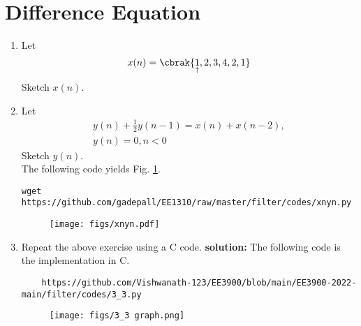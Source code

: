 \documentclass[journal,12pt,twocolumn]{IEEEtran}
\renewcommand\thesection{\arabic{section}}
\begin{document}
\section{Difference Equation}
\begin{enumerate}[label=\thesection.\arabic*,ref=\thesection.\theenumi]
\item Let
\label{def:xn}
\begin{equation}
x(n) = \cbrak{\underset{\uparrow}{1},2,3,4,2,1}
\end{equation}
Sketch $x(n)$.
\item Let
\begin{multline}
\label{eq:iir_filter}
y(n) + \frac{1}{2}y(n-1) = x(n) + x(n-2), 
\\
 y(n) = 0, n < 0
\end{multline}
Sketch $y(n)$.  
\\
\solution The following code yields Fig. \ref{fig:xnyn}.
\begin{lstlisting}
wget https://github.com/gadepall/EE1310/raw/master/filter/codes/xnyn.py
\end{lstlisting}
\begin{figure}[!ht]
\begin{center}
\texttt{[image: figs/xnyn.pdf]}
\end{center}
\label{fig:xnyn}	
\end{figure}
\item Repeat the above exercise using a C code.
\textbf{solution: } The following code is the implementation in C.

\begin{lstlisting}
    https://github.com/Vishwanath-123/EE3900/blob/main/EE3900-2022-main/filter/codes/3_3.py
\end{lstlisting}

\begin{figure}[!h]
\begin{center}
\texttt{[image: figs/3\_3 graph.png]}
\end{center}
\label{fig:xnyn_2}	
\end{figure}

\end{enumerate}
\end{document}
